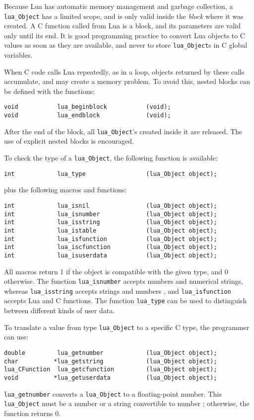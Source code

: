 Because Lua has automatic memory management and garbage collection,
a \verb'lua_Object' has a limited scope,
and is only valid inside the {\em block\/} where it was created.
A C function called from Lua is a block,
and its parameters are valid only until its end.
It is good programming practice to convert Lua objects to C values
as soon as they are available,
and never to store \verb'lua_Object's in C global variables.

When C code calls Lua repeatedly, as in a loop,
objects returned by these calls accumulate,
and may create a memory problem.
To avoid this,
nested blocks can be defined with the functions:
\begin{verbatim}
void           lua_beginblock           (void);
void           lua_endblock             (void);
\end{verbatim}
After the end of the block,
all \verb'lua_Object''s created inside it are released.
The use of explicit nested blocks is encouraged.

To check the type of a \verb'lua_Object',
the following function is available:
\begin{verbatim}
int            lua_type                 (lua_Object object);
\end{verbatim}
plus the following macros and functions:
\begin{verbatim}
int            lua_isnil                (lua_Object object);
int            lua_isnumber             (lua_Object object);
int            lua_isstring             (lua_Object object);
int            lua_istable              (lua_Object object);
int            lua_isfunction           (lua_Object object);
int            lua_iscfunction          (lua_Object object);
int            lua_isuserdata           (lua_Object object);
\end{verbatim}
All macros return 1 if the object is compatible with the given type,
and 0 otherwise.
The function \verb'lua_isnumber' accepts numbers and numerical strings,
whereas
\verb'lua_isstring' accepts strings and numbers ,
and \verb'lua_isfunction' accepts Lua and C functions.
The function \verb'lua_type' can be used to distinguish between
different kinds of user data.

To translate a value from type \verb'lua_Object' to a specific C type,
the programmer can use:
\begin{verbatim}
double         lua_getnumber            (lua_Object object);
char          *lua_getstring            (lua_Object object);
lua_CFunction  lua_getcfunction         (lua_Object object);
void          *lua_getuserdata          (lua_Object object);
\end{verbatim}
\verb'lua_getnumber' converts a \verb'lua_Object' to a floating-point number.
This \verb'lua_Object' must be a number or a string convertible to number
; otherwise, the function returns 0.

